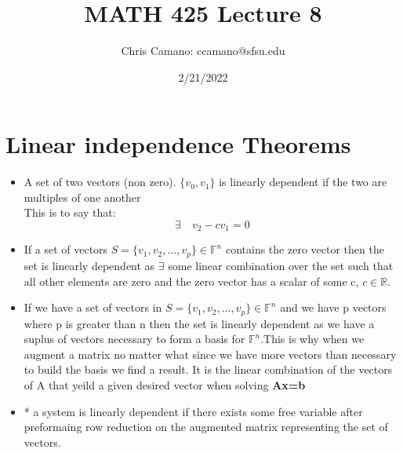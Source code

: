 \documentclass[12pt,a4paper]{article}
\author{Chris Camano: ccamano@sfsu.edu}
\title{MATH 425 Lecture 8 }
\date{2/21/2022}
\newcommand{\R}{\mathbb{R}}
\newcommand{\sect}[1]{\section*{#1}}
\begin{document}
\maketitle
\sect{Linear independence Theorems}
\begin{itemize}
  \newcommand{\Axb}{\textbf{Ax=b} }
  \newcommand{\Axz}{\textbf{Ax=0} }
  \item A set of two vectors (non zero). $\{v_0,v_1\}$ is linearly dependent if the two are multiples of one another\\
  This is to say that:
  \[
    \exists \quad v_2-cv_1=0
  \]
  \item If a set of vectors $S=\{v_1,v_2,...,v_p\} \in \mathbb{F}^n$ contains the zero vector then the set is linearly dependent as $\exists $ some linear combination over the set such that all other elements are zero and the zero vector has a scalar of some c, $c\in \R$.
  \item If we have a set of vectors in $S=\{v_1,v_2,...,v_p\} \in \mathbb{F}^n$ and we have p vectors where p is greater than n then the set is linearly dependent as we have a suplus of vectors necessary to form a basis for $\mathbb{F}^n$.This is why when we augment a matrix no matter what since we have more vectors than necessary to build the basis we find a result. It is the linear combination of the vectors of A that yeild a given desired vector when solving \Axb

  \item * a system is linearly dependent if there exists some free variable after preformaing row reduction on the augmented matrix representing the set of vectors.


\end{itemize}
\end{document}
